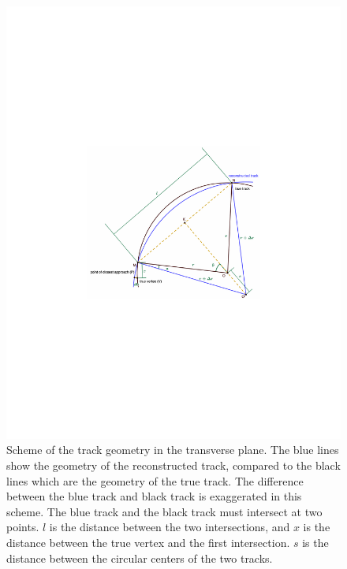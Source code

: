 \begin{figure}[!htb]
      \centering
      \captionsetup{justification=justified}
      \includegraphics[width=\textwidth]{pics/muon_corr/GeoFit/d0_pt_geometry.pdf}
      \caption{Scheme of the track geometry in the transverse plane. 
               The blue lines show the geometry of the reconstructed track, 
               compared to the black lines which are the geometry of the true track.
               The difference between the blue track and black track is exaggerated in this scheme.
               The blue track and the black track must intersect at two points.
               $l$ is the distance between the two intersections, 
               and $x$ is the distance between the true vertex and the first intersection.
               $s$ is the distance between the circular centers of the two tracks.}
      \label{fig:d0_pt_scheme}
\end{figure}

